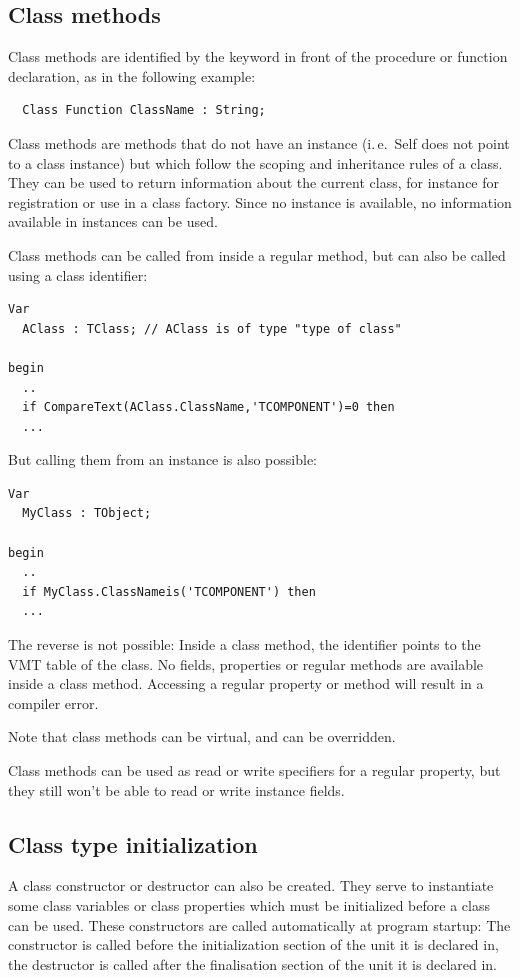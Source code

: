 \subsection{Class methods}
Class methods are identified by the keyword  in front of the
procedure or function declaration, as in the following example:
\begin{verbatim}
  Class Function ClassName : String;
\end{verbatim}
Class methods are methods that do not have an instance (i.\,e.\ Self does not
point to a class instance) but which follow the scoping and inheritance
rules of a class. They can be used to return information about the current
class, for instance for registration or use in a class factory. Since no
instance is available, no information available in instances can be used.

Class methods can be called from inside a regular method, but can also be called
using a class identifier:
\begin{verbatim}
Var
  AClass : TClass; // AClass is of type "type of class"

begin
  ..
  if CompareText(AClass.ClassName,'TCOMPONENT')=0 then
  ...

\end{verbatim}
But calling them from an instance is also possible:
\begin{verbatim}
Var
  MyClass : TObject;

begin
  ..
  if MyClass.ClassNameis('TCOMPONENT') then
  ...
\end{verbatim}
The reverse is not possible: Inside a class method, the  identifier
points to the VMT table of the class. No fields, properties or
regular methods are available inside a class method. Accessing a regular
property or method will result in a compiler error.

Note that class methods can be virtual, and can be overridden.

Class methods can be used as read or write specifiers for a regular property,
but they still won't be able to read or write instance fields.

\subsection{Class type initialization}
A class constructor or destructor can also be created. They serve to instantiate some class variables or class properties which must be initialized before a class can be used.
These constructors are called automatically at program startup: The constructor is called before the initialization section of the unit it is declared in, the destructor is
called after the finalisation section of the unit it is declared in.

